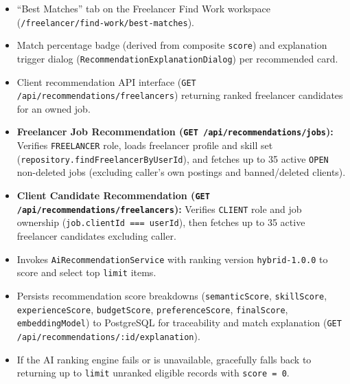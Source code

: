 \begin{itemize}[leftmargin=1.6em,topsep=3pt,itemsep=2pt,parsep=0pt,label=$\bullet$]
    \item ``Best Matches'' tab on the Freelancer Find Work workspace (\texttt{/\allowbreak{}freelancer/\allowbreak{}find-\allowbreak{}work/\allowbreak{}best-\allowbreak{}matches}).
    \item Match percentage badge (derived from composite \texttt{score}) and explanation trigger dialog (\texttt{Recommendation\allowbreak{}Explanation\allowbreak{}Dialog}) per recommended card.
    \item Client recommendation API interface (\texttt{GET /api/recommendations/freelancers}) returning ranked freelancer candidates for an owned job.
\end{itemize}

\begin{itemize}[leftmargin=1.6em,topsep=3pt,itemsep=2pt,parsep=0pt,label=$\bullet$]
    \item \textbf{Freelancer Job Recommendation (\texttt{GET /\allowbreak{}api/\allowbreak{}recommendations/\allowbreak{}jobs}):} Verifies \texttt{FREELANCER} role, loads freelancer profile and skill set (\texttt{repository.\allowbreak{}find\allowbreak{}Freelancer\allowbreak{}By\allowbreak{}User\allowbreak{}Id}), and fetches up to 35 active \texttt{OPEN} non-deleted jobs (excluding caller's own postings and banned/deleted clients).
    \item \textbf{Client Candidate Recommendation (\texttt{GET /\allowbreak{}api/\allowbreak{}recommendations/\allowbreak{}freelancers}):} Verifies \texttt{CLIENT} role and job ownership (\texttt{job.\allowbreak{}clientId =\allowbreak{}=\allowbreak{}= userId}), then fetches up to 35 active freelancer candidates excluding caller.
    \item Invokes \texttt{Ai\allowbreak{}Recommendation\allowbreak{}Service} with ranking version \texttt{hybrid-1.\allowbreak{}0.\allowbreak{}0} to score and select top \texttt{limit} items.
    \item Persists recommendation score breakdowns (\texttt{semanticScore}, \texttt{skillScore}, \texttt{experience\allowbreak{}Score}, \texttt{budgetScore}, \texttt{preference\allowbreak{}Score}, \texttt{finalScore}, \texttt{embeddingModel}) to PostgreSQL for traceability and match explanation (\texttt{GET /\allowbreak{}api/\allowbreak{}recommendations/\allowbreak{}:\allowbreak{}id/\allowbreak{}explanation}).
    \item If the AI ranking engine fails or is unavailable, gracefully falls back to returning up to \texttt{limit} unranked eligible records with \texttt{score = 0}.
\end{itemize}


